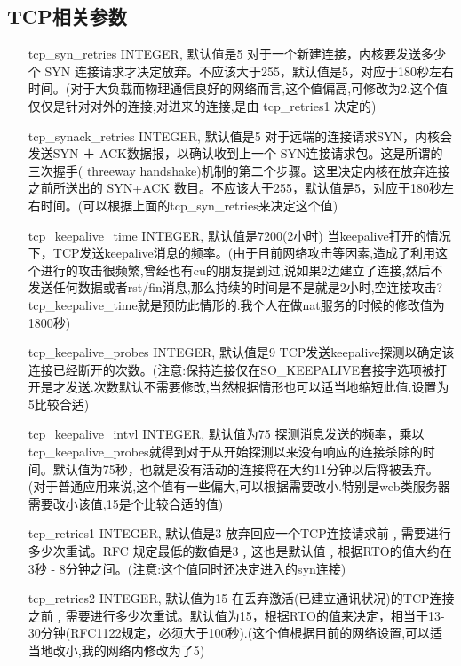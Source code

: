 	\subsection{TCP相关参数}
\begin{enumerate}
\item[tcp\_syn\_retries]  INTEGER,
默认值是5
对于一个新建连接，内核要发送多少个 SYN 连接请求才决定放弃。不应该大于255，默认值是5，对应于180秒左右时间。(对于大负载而物理通信良好的网络而言,这个值偏高,可修改为2.这个值仅仅是针对对外的连接,对进来的连接,是由
tcp\_retries1 决定的)

\item[tcp\_synack\_retries] INTEGER,
默认值是5
对于远端的连接请求SYN，内核会发送SYN ＋ ACK数据报，以确认收到上一个 SYN连接请求包。这是所谓的三次握手( threeway handshake)机制的第二个步骤。这里决定内核在放弃连接之前所送出的 SYN+ACK 数目。不应该大于255，默认值是5，对应于180秒左右时间。(可以根据上面的tcp\_syn\_retries来决定这个值)

\item[tcp\_keepalive\_time] INTEGER,
默认值是7200(2小时)
当keepalive打开的情况下，TCP发送keepalive消息的频率。(由于目前网络攻击等因素,造成了利用这个进行的攻击很频繁,曾经也有cu的朋友提到过,说如果2边建立了连接,然后不发送任何数据或者rst/fin消息,那么持续的时间是不是就是2小时,空连接攻击?tcp\_keepalive\_time就是预防此情形的.我个人在做nat服务的时候的修改值为1800秒)

\item[tcp\_keepalive\_probes] INTEGER,
默认值是9
TCP发送keepalive探测以确定该连接已经断开的次数。(注意:保持连接仅在SO\_KEEPALIVE套接字选项被打开是才发送.次数默认不需要修改,当然根据情形也可以适当地缩短此值.设置为5比较合适)

\item[tcp\_keepalive\_intvl] INTEGER,
默认值为75
探测消息发送的频率，乘以tcp\_keepalive\_probes就得到对于从开始探测以来没有响应的连接杀除的时间。默认值为75秒，也就是没有活动的连接将在大约11分钟以后将被丢弃。(对于普通应用来说,这个值有一些偏大,可以根据需要改小.特别是web类服务器需要改小该值,15是个比较合适的值)

\item[tcp\_retries1] INTEGER,
默认值是3
放弃回应一个TCP连接请求前﹐需要进行多少次重试。RFC 规定最低的数值是3﹐这也是默认值﹐根据RTO的值大约在3秒 - 8分钟之间。(注意:这个值同时还决定进入的syn连接)

\item[tcp\_retries2] INTEGER,
默认值为15
在丢弃激活(已建立通讯状况)的TCP连接之前﹐需要进行多少次重试。默认值为15，根据RTO的值来决定，相当于13-30分钟(RFC1122规定，必须大于100秒).(这个值根据目前的网络设置,可以适当地改小,我的网络内修改为了5)


\end{enumerate}

